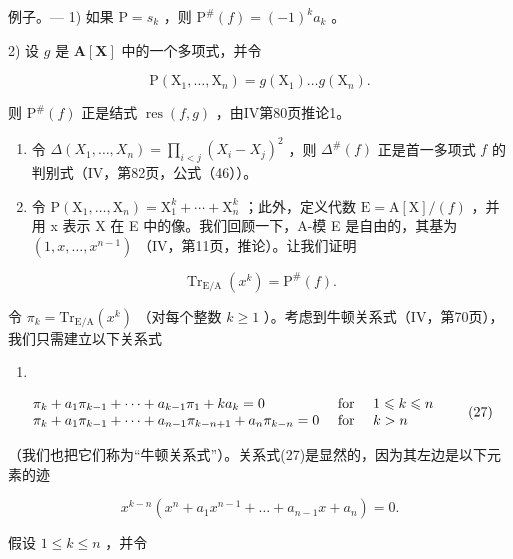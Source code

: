 例子。--- 1) 如果 \(\mathrm{P} = s_k\) ，则 \(\mathrm{P}^{\#}(f) = (-1)^k a_k\) 。

2) 设 \(g\) 是 \(\mathbf{A}[\mathbf{X}]\) 中的一个多项式，并令

\[
\mathrm{P} \left(\mathrm{X} _ {1}, \dots , \mathrm{X} _ {n}\right) = g \left(\mathrm{X} _ {1}\right) \dots g \left(\mathrm{X} _ {n}\right).
\]

则 \(\mathrm{P}^{\#}(f)\) 正是结式 \(\operatorname{res}(f, g)\) ，由IV第80页推论1。

\begin{enumerate}
\def\labelenumi{\arabic{enumi})}
\setcounter{enumi}{2}
\item
  令 \(\Delta(X_1, \ldots, X_n) = \prod_{i < j} (X_i - X_j)^2\) ，则 \(\Delta^{\#}(f)\) 正是首一多项式 \(f\) 的判别式（IV，第82页，公式（46））。
\item
  令 \(\mathrm{P}(\mathrm{X}_{1},\ldots,\mathrm{X}_{n})=\mathrm{X}_{1}^{k}+\cdots+\mathrm{X}_{n}^{k}\) ；此外，定义代数 \(\mathrm{E}=\mathrm{A}[\mathrm{X}]/(f)\) ，并用 x 表示 X 在 E 中的像。我们回顾一下，A-模 E 是自由的，其基为 \((1,x,\ldots,x^{n-1})\) （IV，第11页，推论）。让我们证明
\end{enumerate}

\[
\operatorname{Tr} _ {\mathrm{E/A}} (x ^ {k}) = \mathrm{P} ^ {\#} (f).\tag{25}
\]

令 \(\pi_k = \mathrm{Tr}_{\mathrm{E / A}}(x^k)\) （对每个整数 \(k \geqslant 1\) ）。考虑到牛顿关系式（IV，第70页），我们只需建立以下关系式

\begin{enumerate}
\def\labelenumi{(\arabic{enumi})}
\setcounter{enumi}{25}
\tightlist
\item
\end{enumerate}

\[
\begin{array}{l l} \pi_ {k} + a _ {1} \pi_ {k - 1} + \dots + a _ {k - 1} \pi_ {1} + k a _ {k} = 0 & \text { for } \quad 1 \leqslant k \leqslant n \\ \pi_ {k} + a _ {1} \pi_ {k - 1} + \dots + a _ {n - 1} \pi_ {k - n + 1} + a _ {n} \pi_ {k - n} = 0 & \text { for } \quad k > n \end{array}\tag{27}
\]

（我们也把它们称为“牛顿关系式”）。关系式(27)是显然的，因为其左边是以下元素的迹

\[
x ^ {k - n} \left(x ^ {n} + a _ {1} x ^ {n - 1} + \dots + a _ {n - 1} x + a _ {n}\right) = 0.
\]

假设 \(1 \leqslant k \leqslant n\) ，并令

